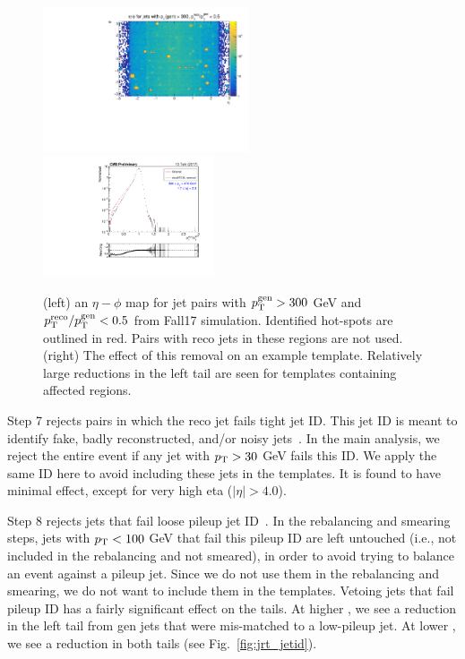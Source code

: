 \begin{figure}[htbp]
  \begin{center}
    \includegraphics[width=0.54\textwidth]{figs/jetmet/ecalDeadCells.pdf}
    \includegraphics[width=0.45\textwidth]{figs/jetmet/compare_ecalDeadCell.pdf}
    \caption{(left) an $\eta-\phi$ map for jet pairs with $p_{\mathrm{T}}^\text{gen}> 300$ GeV and
    $p_{\mathrm{T}}^\text{reco}/p_{\mathrm{T}}^\text{gen} < 0.5$ from Fall17 simulation. Identified hot-spots
    are outlined in red. Pairs with reco jets in these regions are not used.
    (right) The effect of this removal on an example template. Relatively large reductions
    in the left tail are seen for templates containing affected regions.
    }
    \label{fig:jrt_ecalDeadCell}
  \end{center}
\end{figure}

Step 7 rejects pairs in which the reco jet fails tight jet ID.
This jet ID is meant to identify fake, badly reconstructed, and/or noisy jets~\cite{JetID}.
In the main analysis, we reject the entire event if any jet with $p_{\mathrm{T}}>30$ GeV
fails this ID. We apply the same ID here to avoid including these jets in 
the templates. It is found to have minimal effect, except for very high eta ($|\eta|>4.0$).

Step 8 rejects jets that fail loose pileup jet ID~\cite{JME_pileup_id}. In the rebalancing and smearing steps,
jets with $p_{\mathrm{T}}<100$ GeV that fail this pileup ID are left untouched (i.e., not included
in the rebalancing and not smeared), in order to avoid trying to balance an event
against a pileup jet. Since we do not use them in the rebalancing and smearing, 
we do not want to include them in the templates.
Vetoing jets that fail pileup ID has a fairly significant effect on the tails.
At higher \pt, we see a reduction in the left tail from gen jets that were
mis-matched to a low-\pt pileup jet. At lower \pt, we see a reduction in both tails
(see Fig.~\ref{fig:jrt_jetid}).

